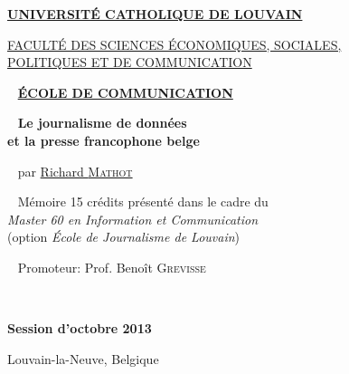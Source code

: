 
\begin{center}

\Large \href{http://www.uclouvain.be/}{\textbf{UNIVERSITÉ CATHOLIQUE DE LOUVAIN}}

\large \href{http://www.uclouvain.be/espo}{FACULTÉ DES SCIENCES ÉCONOMIQUES, SOCIALES, \\
POLITIQUES ET DE COMMUNICATION}

~ \vfill
\large \href{http://www.uclouvain.be/comu}{\textbf{ÉCOLE DE COMMUNICATION}}

~ \vfill
\huge\textbf{Le journalisme de données \\et la presse francophone belge}%

~ \vfill
\large par \href{mailto:richard.mathot@gmail.com}{Richard \textsc{Mathot}}

~ \vfill
\normalsize Mémoire 15 crédits présenté dans le cadre du \\
\emph{Master 60 en Information et Communication}\\
(option \emph{École de Journalisme de Louvain})

\end{center}


~ \vfill
\hspace{6cm} Promoteur: Prof. Benoît \textsc{Grevisse}



~ \vfill

\begin{center}
\normalsize \textbf{Session d'octobre 2013}

Louvain-la-Neuve, Belgique
\end{center}

\thispagestyle{empty}

